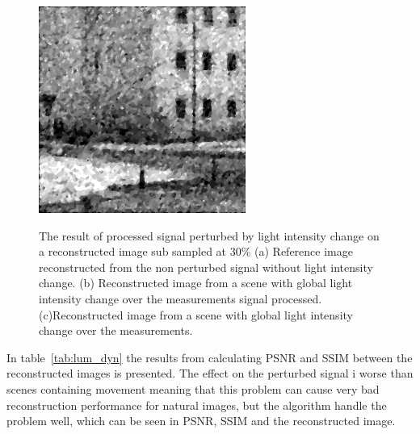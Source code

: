 \begin{figure}[H]
\begin{minipage}[t]{0.32\textwidth}
    \subcaption{}
    \label{fig:lum_4}
\end{minipage}
\begin{minipage}[t]{0.32\textwidth}
    \includegraphics[width = \textwidth]{result/dynamic/lum/intense_change_psnr_19_snr_14_sssim_38.png}
    \subcaption{}
    \label{fig:lum_32}
\end{minipage}
    \caption{The result of processed signal perturbed by light intensity change on a reconstructed image sub sampled at 30\% (a) Reference image reconstructed from the non perturbed signal without light intensity change. (b) Reconstructed image from a scene with global light intensity change over the measurements signal processed. (c)Reconstructed image from a scene with global light intensity change over the measurements.}
    \label{fig:lum_rec}
\end{figure}

In table~\ref{tab:lum_dyn} the results from calculating PSNR and SSIM between the reconstructed images is presented. The effect on the perturbed signal i worse than scenes containing movement meaning that this problem can cause very bad reconstruction performance for natural images, but the algorithm handle the problem well, which can be seen in PSNR, SSIM and the reconstructed image.


